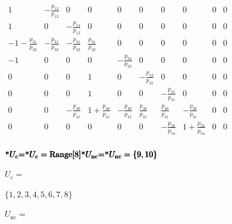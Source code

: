 \documentclass{article}
\newcommand{\unicode}[1]{{}}
\begin{document}
\begin{doublespace}
\noindent\(\begin{array}{llllllllll}
 1 & -\frac{p_{1\unicode{f3d5}3}}{p_{1\unicode{f3d5}2}} & 0 & 0 & 0 & 0 & 0 & 0 & 0 & 0 \\
 1 & 0 & -\frac{p_{1\unicode{f3d5}4}}{p_{1\unicode{f3d5}2}} & 0 & 0 & 0 & 0 & 0 & 0 & 0 \\
 -1-\frac{p_{3\unicode{f3d5}1}}{p_{3\unicode{f3d5}2}} & -\frac{p_{3\unicode{f3d5}1}}{p_{3\unicode{f3d5}2}} & -\frac{p_{3\unicode{f3d5}1}}{p_{3\unicode{f3d5}2}}
& \frac{p_{3\unicode{f3d5}1}}{p_{3\unicode{f3d5}2}} & 0 & 0 & 0 & 0 & 0 & 0 \\
 -1 & 0 & 0 & 0 & -\frac{p_{3\unicode{f3d5}4}}{p_{3\unicode{f3d5}2}} & 0 & 0 & 0 & 0 & 0 \\
 0 & 0 & 0 & 1 & 0 & -\frac{p_{4\unicode{f3d5}3}}{p_{4\unicode{f3d5}1}} & 0 & 0 & 0 & 0 \\
 0 & 0 & 0 & 1 & 0 & 0 & -\frac{p_{4\unicode{f3d5}5}}{p_{4\unicode{f3d5}1}} & 0 & 0 & 0 \\
 0 & 0 & -\frac{p_{4\unicode{f3d5}6}}{p_{4\unicode{f3d5}1}} & 1+\frac{p_{4\unicode{f3d5}6}}{p_{4\unicode{f3d5}1}} & -\frac{p_{4\unicode{f3d5}6}}{p_{4\unicode{f3d5}1}}
& \frac{p_{4\unicode{f3d5}6}}{p_{4\unicode{f3d5}1}} & \frac{p_{4\unicode{f3d5}6}}{p_{4\unicode{f3d5}1}} & -\frac{p_{4\unicode{f3d5}6}}{p_{4\unicode{f3d5}1}}
& 0 & 0 \\
 0 & 0 & 0 & 0 & 0 & 0 & -\frac{p_{5\unicode{f3d5}6}}{p_{5\unicode{f3d5}4}} & 1+\frac{p_{5\unicode{f3d5}6}}{p_{5\unicode{f3d5}4}} & 0 & 0 \\
\end{array}\)
\end{doublespace}

\begin{doublespace}
\noindent\(\pmb{\texttt{"}U_c\text{=$\texttt{"}$}}\\
\pmb{U_c=\text{Range}[8]}\\
\pmb{\texttt{"}U_{\text{nc}}\text{=$\texttt{"}$}}\\
\pmb{U_{\text{nc}}=\{9,10\}}\)
\end{doublespace}

\begin{doublespace}
\noindent\(U_c=\)
\end{doublespace}

\begin{doublespace}
\noindent\(\{1,2,3,4,5,6,7,8\}\)
\end{doublespace}

\begin{doublespace}
\noindent\(U_{\text{nc}}=\)
\end{doublespace}
\end{document}
